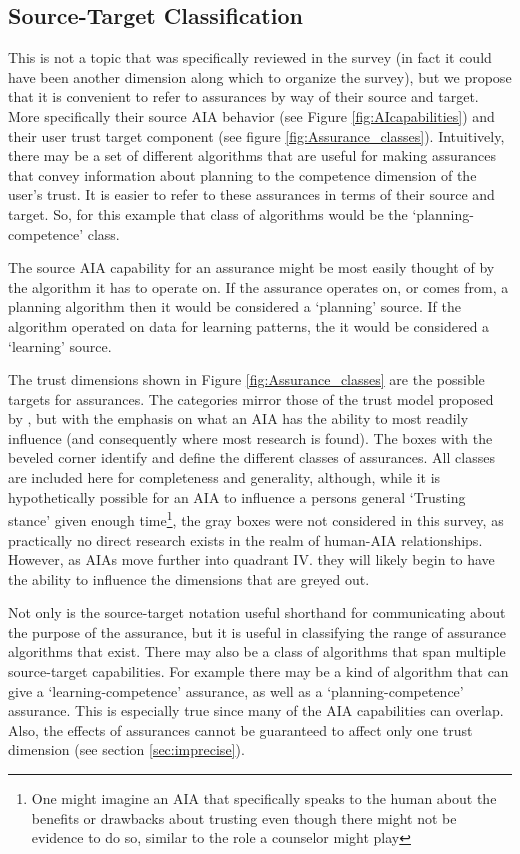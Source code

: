 \subsection{Source-Target Classification}
    This is not a topic that was specifically reviewed in the survey (in fact it could have been another dimension along which to organize the survey), but we propose that it is convenient to refer to assurances by way of their source and target. More specifically their source AIA behavior (see Figure \ref{fig:AIcapabilities}) and their user trust target component (see figure \ref{fig:Assurance_classes}). Intuitively, there may be a set of different algorithms that are useful for making assurances that convey information about planning to the competence dimension of the user's trust. It is easier to refer to these assurances in terms of their source and target. So, for this example that class of algorithms would be the `planning-competence' class.

    The source AIA capability for an assurance might be most easily thought of by the algorithm it has to operate on. If the assurance operates on, or comes from, a planning algorithm then it would be considered a `planning' source. If the algorithm operated on data for learning patterns, the it would be considered a `learning' source.

    The trust dimensions shown in Figure \ref{fig:Assurance_classes} are the possible targets for assurances. The categories mirror those of the trust model proposed by \citet{McKnight2001-fa}, but with the emphasis on what an AIA has the ability to most readily influence (and consequently where most research is found). The boxes with the beveled corner identify and define the different classes of assurances. All classes are included here for completeness and generality, although, while it is hypothetically possible for an AIA to influence a persons general `Trusting stance' given enough time\footnote{One might imagine an AIA that specifically speaks to the human about the benefits or drawbacks about trusting even though there might not be evidence to do so, similar to the role a counselor might play}, the gray boxes were not considered in this survey, as practically no direct research exists in the realm of human-AIA relationships. However, as AIAs move further into quadrant IV. they will likely begin to have the ability to influence the dimensions that are greyed out.
    
    Not only is the source-target notation useful shorthand for communicating about the purpose of the assurance, but it is useful in classifying the range of assurance algorithms that exist. There may also be a class of algorithms that span multiple source-target capabilities. For example there may be a kind of algorithm that can give a `learning-competence' assurance, as well as a `planning-competence' assurance. This is especially true since many of the AIA capabilities can overlap. Also, the effects of assurances cannot be guaranteed to affect only one trust dimension (see section \ref{sec:imprecise}).

